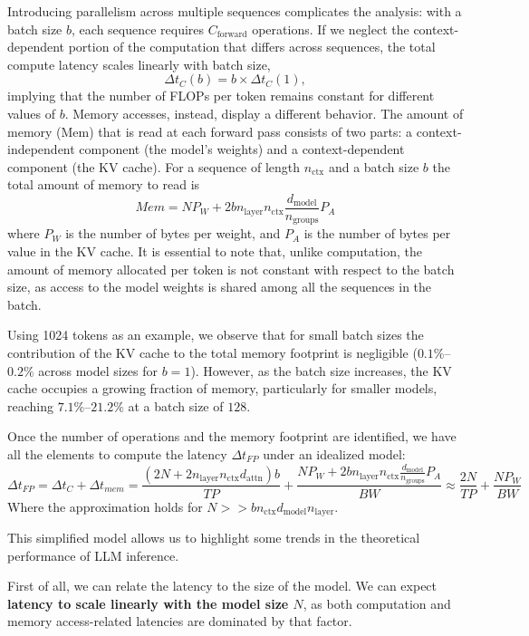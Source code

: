 Introducing parallelism across multiple sequences complicates the analysis: with a batch size $b$, each sequence requires $C_{\text{forward}}$ operations. If we neglect the context-dependent portion of the computation that differs across sequences, the total compute latency scales linearly with batch size,
\[
\Delta t_{C}(b) = b \times \Delta t_{C}(1),
\]
implying that the number of FLOPs per token remains constant for different values of $b$.
Memory accesses, instead, display a different behavior. The amount of memory (\( \text{Mem} \)) that is read at each forward pass consists of two parts: a context-independent component (the model’s weights) and a context-dependent component (the KV cache).  
For a sequence of length $n_{\text{ctx}}$ and a batch size $b$ the total amount of memory to read is
\[
Mem = NP_W + 2bn_\text{layer} n_{\text{ctx}} \frac{ d_{\text{model}} }{n_{\text{groups}}} P_A
\]
where $P_W$ is the number of bytes per weight, and $P_A$ is the number of bytes per value in the KV cache.
It is essential to note that, unlike computation, the amount of memory allocated per token is not constant with respect to the batch size, as access to the model weights is shared among all the sequences in the batch.

Using 1024 tokens as an example, we observe that for small batch sizes the contribution of the KV cache to the total memory footprint is negligible ($0.1\%$–$0.2\%$ across model sizes for $b=1$). However, as the batch size increases, the KV cache occupies a growing fraction of memory, particularly for smaller models, reaching $7.1\%$–$21.2\%$ at a batch size of $128$.

Once the number of operations and the memory footprint are identified, we have all the elements to compute the latency $\Delta t_{FP}$ under an idealized model:
\[
\Delta t_{FP} = \Delta t_{C} + \Delta t_{mem} = \frac{(2N + 2n_\text{layer} n_{\text{ctx}} d_{\text{attn}})b}{TP} + \frac{NP_W + 2bn_\text{layer} n_{\text{ctx}} \frac{ d_{\text{model}}}{n_{\text{groups}}} P_A}{BW} \approx \frac{2N}{TP} + \frac{NP_W}{BW}
\]
Where the approximation holds for $N >> b n_{\text{ctx}} d_{\text{model}}n_\text{layer}$.

This simplified model allows us to highlight some trends in the theoretical performance of LLM inference.

First of all, we can relate the latency to the size of the model. We can expect \textbf{latency to scale linearly with the model size $N$}, as both computation and memory access-related latencies are dominated by that factor.


